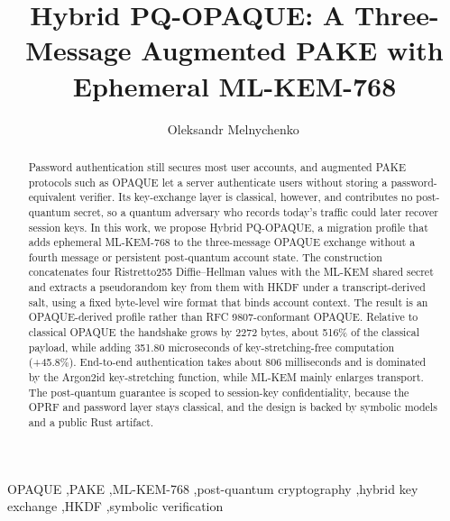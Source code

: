 \documentclass[preprint,12pt]{elsarticle}
\theoremstyle{remark}
\begin{document}

\begin{frontmatter}

\title{Hybrid PQ-OPAQUE: A Three-Message Augmented PAKE with Ephemeral ML-KEM-768}

\author{Oleksandr Melnychenko\texorpdfstring{\,}{}\texorpdfstring{}{}}

\address{Khmelnytskyi National University, Khmelnytskyi, Ukraine}


\begin{abstract}
Password authentication still secures most user accounts, and augmented PAKE
protocols such as OPAQUE let a server authenticate users without storing a
password-equivalent verifier. Its key-exchange layer is classical, however, and
contributes no post-quantum secret, so a quantum adversary who records today's
traffic could later recover session keys. In this work, we propose Hybrid
PQ-OPAQUE, a migration profile that adds ephemeral ML-KEM-768 to the
three-message OPAQUE exchange without a fourth message or persistent
post-quantum account state. The construction concatenates four Ristretto255
Diffie--Hellman values with the ML-KEM shared secret and extracts a pseudorandom
key from them with HKDF under a transcript-derived salt, using a fixed byte-level
wire format that binds account context. The result is an OPAQUE-derived profile
rather than RFC 9807-conformant OPAQUE. Relative to classical OPAQUE the handshake grows by 2272
bytes, about 516\% of the classical payload, while adding 351.80
microseconds of key-stretching-free computation (+45.8\%). End-to-end authentication takes about 806 milliseconds and is dominated by
the Argon2id key-stretching function, while ML-KEM mainly enlarges transport.
The post-quantum guarantee is scoped to session-key confidentiality, because the
OPRF and password layer stays classical, and the design is backed by symbolic
models and a public Rust artifact.
\end{abstract}

\begin{keyword}
OPAQUE \sep PAKE \sep ML-KEM-768 \sep post-quantum cryptography \sep hybrid key exchange \sep HKDF \sep symbolic verification
\end{keyword}

\end{frontmatter}
\end{document}
